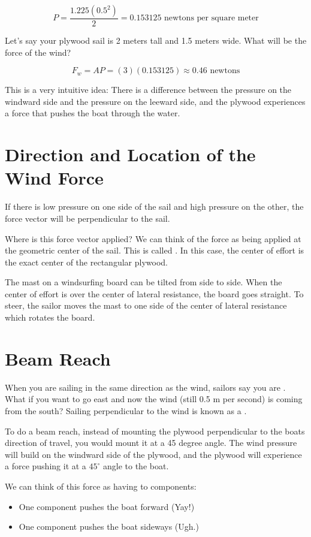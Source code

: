 $$P =  \frac{1.225 (0.5^2)}{2} =  0.153125 \text{ newtons per square meter}$$

Let's say your plywood sail is 2 meters tall and 1.5 meters wide.  What will be the force of the wind?

$$F_w  = A P = (3)(0.153125) \approx 0.46 \text{ newtons}$$

This is a very intuitive idea:  There is a difference between the pressure on the windward side and the pressure on the leeward side,  and the plywood experiences a force that pushes
the boat through the water.

\section{Direction and Location of the Wind Force}

If there is low pressure on one side of the sail and high pressure on the other,  the force vector will be perpendicular to the sail. 
 
Where is this force vector applied?  We can think of the force as being applied at the geometric center of the sail.  This is called .   In this case,  the center of effort is the exact center of the rectangular plywood.

The mast on a windsurfing board can be tilted from side to side.  When the center of effort is over the center of lateral resistance,  the board goes straight.
To steer,   the sailor moves the mast to one side of the center of lateral resistance which rotates the board.

\section{Beam Reach}

When you are sailing in the same direction as the wind,  sailors say you are .   What if you want to go east and now the wind (still 0.5 m per second) is coming from the south?  Sailing perpendicular to the wind is known as a .

To do a beam reach,  instead of mounting the plywood perpendicular to the boats direction of travel,  you would mount it at a 45 degree angle.   The wind pressure will build on the windward
side of the plywood,  and the plywood will experience a force pushing it at a $45^\circ$ angle to the boat.

We can think of this force as having to components: 
\begin{itemize}
\item One component pushes the boat forward (Yay!)
\item One component pushes the boat sideways (Ugh.)
\end{itemize}

